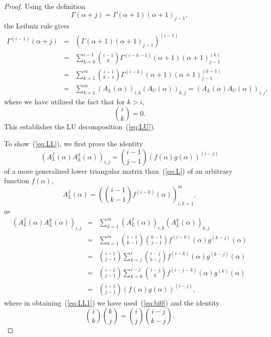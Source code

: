 \documentclass[pdflatex,sn-mathphys-num]{sn-jnl}%
\theoremstyle{thmstyleone}
\begin{document}
\begin{proof}
Using the definition
\begin{equation}
\Gamma(\alpha+j)=\Gamma(\alpha+1)(\alpha+1)_{j-1},
\end{equation}
the Leibniz rule gives
\begin{eqnarray}
\Gamma^{(i-1)}(\alpha+j) &=& \left(\Gamma(\alpha+1)(\alpha+1)_{j-1}\right)^{(i-1)} \\
&=& \sum_{k=0}^{i-1}\binom{i-1}{k}\Gamma^{(i-k-1)}(\alpha+1)(\alpha+1)_{j-1}^{(k)} \\
&=& \sum_{k=1}^{m}\binom{i-1}{k-1}\Gamma^{(i-k)}(\alpha+1)(\alpha+1)_{j-1}^{(k-1)} \\
&=& \sum_{k=1}^{m}\left(A_{L}(\alpha)\right)_{i,k}\left(A_{U}(\alpha)\right)_{k,j}=\left(A_{L}(\alpha)A_{U}(\alpha)\right)_{i,j},
\end{eqnarray}
where we have utilized the fact that for $k>i$,
\begin{equation}\label{eq:bi0}
\binom{i}{k}=0.
\end{equation}
This establishes the LU decomposition~(\ref{eq:LU}).

To show~(\ref{eq:LL}), we first prove the identity
\begin{equation}\label{eq:LLi}
\left(A_{L}^{f}(\alpha)A_{L}^{g}(\alpha)\right)_{i,j}=\binom{i-1}{j-1}\left(f(\alpha)g(\alpha)\right)^{(i-j)}
\end{equation}
of a more generalized lower triangular matrix than~(\ref{eq:L}) of an arbitrary function $f(\alpha)$,
\begin{equation}
A_{L}^{f}(\alpha)=\left(\binom{i-1}{k-1}f^{(i-k)}(\alpha)\right)_{i,k=1}^{m},
\end{equation}
as
\begin{eqnarray}
\left(A_{L}^{f}(\alpha)A_{L}^{g}(\alpha)\right)_{i,j} &=& \sum_{k=1}^{m}\left(A_{L}^{f}(\alpha)\right)_{i,k}\left(A_{L}^{g}(\alpha)\right)_{k,j} \\
&=& \sum_{k=1}^{m}\binom{i-1}{k-1}\binom{k-1}{j-1}f^{(i-k)}(\alpha)g^{(k-j)}(\alpha) \\
&=& \binom{i-1}{j-1}\sum_{k=j}^{i}\binom{i-j}{k-j}f^{(i-k)}(\alpha)g^{(k-j)}(\alpha) \label{eq:LL1} \\
&=& \binom{i-1}{j-1}\sum_{k=0}^{i-j}\binom{i-j}{k}f^{(i-j-k)}(\alpha)g^{(k)}(\alpha) \\
&=& \binom{i-1}{j-1}\left(f(\alpha)g(\alpha)\right)^{(i-j)},
\end{eqnarray}
where in obtaining~(\ref{eq:LL1}) we have used~(\ref{eq:bi0}) and the identity
\begin{equation}
\binom{i}{k}\binom{k}{j}=\binom{i}{j}\binom{i-j}{k-j}.
\end{equation}


\end{proof}
\end{document}
